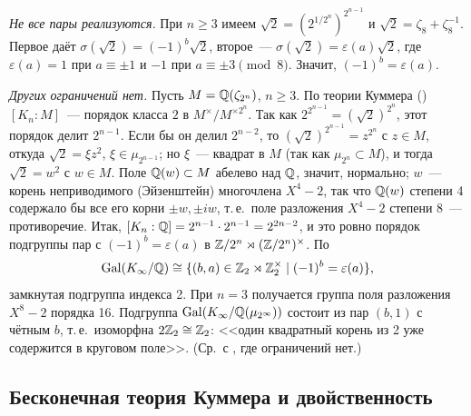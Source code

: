 \begin{example}[7.36]
\emph{Не все пары реализуются.} При $n\ge3$ имеем $\sqrt2=(2^{1/2^n})^{2^{n-1}}$ и $\sqrt2=\zeta_8+\zeta_8^{-1}$. Первое
даёт $\sigma(\sqrt2)=(-1)^b\sqrt2$, второе~--- $\sigma(\sqrt2)=\varepsilon(a)\sqrt2$, где $\varepsilon(a)=1$ при
$a\equiv\pm1$ и $-1$ при $a\equiv\pm3\pmod8$. Значит, $(-1)^b=\varepsilon(a)$.

\emph{Других ограничений нет.} Пусть $M=\mathbb Q(\zeta_{2^n})$, $n\ge3$. По теории Куммера () $[K_n:M]$~--- порядок класса
$2$ в $M^\times/M^{\times2^n}$. Так как $2^{2^{n-1}}=(\sqrt2)^{2^n}$, этот порядок делит $2^{n-1}$. Если бы он делил
$2^{n-2}$, то $(\sqrt2)^{2^{n-1}}=z^{2^n}$ с $z\in M$, откуда $\sqrt2=\xi z^2$, $\xi\in\mu_{2^{n-1}}$; но $\xi$~--- квадрат
в $M$ (так как $\mu_{2^n}\subset M$), и тогда $\sqrt2=w^2$ с $w\in M$. Поле $\mathbb Q(w)\subset M$ абелево над $\mathbb Q$, значит,
нормально; $w$~--- корень неприводимого (Эйзенштейн) многочлена $X^4-2$, так что $\mathbb Q(w)$ степени 4 содержало бы все его
корни $\pm w,\pm iw$, т.\,е.\ поле разложения $X^4-2$ степени 8~--- противоречие. Итак, $[K_n:\mathbb Q]=2^{n-1}\cdot2^{n-1}=2^{2n-2}$,
и это ровно порядок подгруппы пар с $(-1)^b=\varepsilon(a)$ в $\mathbb Z/2^n\rtimes(\mathbb Z/2^n)^\times$. По 
\[
\operatorname{Gal}(K_\infty/\mathbb Q)\cong\{(b,a)\in\mathbb Z_2\rtimes\mathbb Z_2^\times\mid(-1)^b=\varepsilon(a)\},
\]
замкнутая подгруппа индекса 2. При $n=3$ получается группа поля разложения $X^8-2$ порядка 16. Подгруппа
$\operatorname{Gal}(K_\infty/\mathbb Q(\mu_{2^\infty}))$ состоит из пар $(b,1)$ с чётным $b$, т.\,е.\ изоморфна $2\mathbb Z_2\cong\mathbb Z_2$: <<один
квадратный корень из 2 уже содержится в круговом поле>>. (Ср.\ с , где ограничений нет.)
\end{example}

\subsection*{Бесконечная теория Куммера и двойственность}

